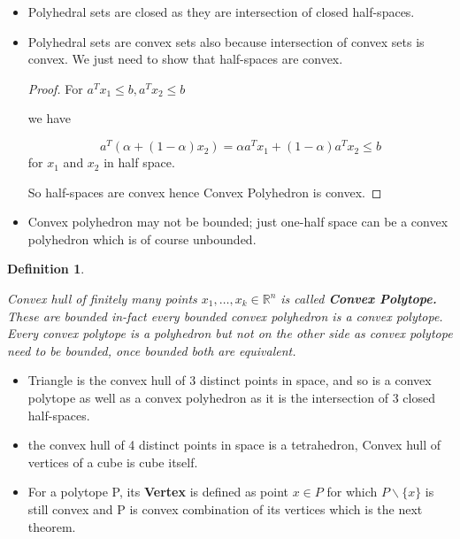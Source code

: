 \documentclass[oneside]{book}
\newtheorem{mydef}{Definition}[section]
\begin{document}
	
	\begin{itemize}
		\item
		Polyhedral sets are closed as they are intersection of closed half-spaces. 
		\item
		Polyhedral sets  are convex sets  also because intersection of convex sets is convex. We just need to show that half-spaces are convex.\par
		\begin{proof}
			For $a^{T} x_{1} \leq b, a^{T} x_{2} \leq b$ \par 
			we have 
			
			$$a^{T}\left(\alpha +(1- \alpha) x_{2}\right)=\alpha a^{T} x_{1}+(1-\alpha) a^{T} x_{2} \leq b$$ 
			for $x_{1} $ and $x_{2}$ in half space.  \par
			So half-spaces are convex hence  Convex Polyhedron  is convex.\par 
		\end{proof}
		
		\item
		Convex polyhedron may not be bounded; just one-half space can be a convex polyhedron which is of course unbounded. 
	\end{itemize}
	
	\begin{mydef} \label{d:6}
		
		Convex hull of finitely many points $x_1,\ldots ,x_k \in \mathbb{R}^n $ is called \textbf{Convex Polytope.} 
		These are bounded in-fact every bounded convex polyhedron is a convex polytope.\\
		Every convex polytope is a polyhedron but not on the other side as convex polytope need to be bounded, once bounded both are equivalent.
		
		
	\end{mydef}
	
	
	\begin{itemize}
		\item
		
		Triangle is the convex hull of 3 distinct points in space, and so is a convex polytope as well as a convex polyhedron as it is the intersection of 3 closed half-spaces.
		
		\item
		the convex hull of 4 distinct points in space is a tetrahedron, Convex hull of vertices of a cube is cube itself. 
		
		\item
		For a polytope P, its \textbf{Vertex} is defined as point $x \in P$ for which $P \backslash \{x\} $ is  still convex and P is convex combination of its vertices which is  the next theorem. 
	\end{itemize}
	
\end{document}
